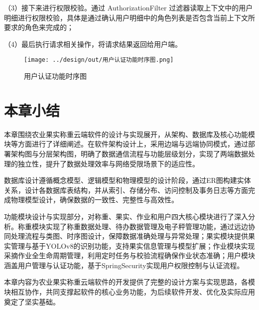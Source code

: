 （3）接下来进行权限校验。通过 AuthorizationFilter 过滤器读取上下文中的用户明细进行权限校验，具体是通过确认用户明细中的角色列表是否包含当前上下文所要求的角色来完成的；

（4）最后执行请求相关操作，将请求结果返回给用户端。

\begin{figure}
    \centering
    \texttt{[image: ../design/out/用户认证功能时序图.png]}
    \caption{用户认证功能时序图}
    \label{fig:用户认证功能时序图}
\end{figure}

\section{本章小结}

本章围绕农业果实称重云端软件的设计与实现展开，从架构、数据库及核心功能模块等方面进行了详细阐述。在软件架构设计上，采用边端与远端协同模式，通过部署架构图与分层架构图，明确了数据通信流程与功能层级划分，实现了两端数据处理的独立性，提升了数据处理效率与网络受限场景下的适应性。

数据库设计遵循概念模型、逻辑模型和物理模型的设计阶段，通过ER图构建实体关系，设计各数据库表结构，并从索引、存储分布、访问控制及事务日志等方面完成物理模型设计，确保数据的一致性、完整性与高效性。

功能模块设计与实现部分，对称重、果实、作业和用户四大核心模块进行了深入分析。称重模块实现了称重数据处理、待办数据管理及电子秤管理功能，通过远边协同处理流程与类图、时序图设计，保障数据准确处理与异常处理；果实模块提供果实管理与基于YOLOv8的识别功能，支持果实信息管理与模型扩展；作业模块实现采摘作业全生命周期管理，利用定时任务与校验流程确保作业状态准确；用户模块涵盖用户管理与认证功能，基于SpringSecurity实现用户权限控制与认证流程。

本章内容为农业果实称重云端软件的开发提供了完整的设计方案与实现思路，各模块相互协作，共同支撑起软件的核心业务功能，为后续软件开发、优化及实际应用奠定了坚实基础。


